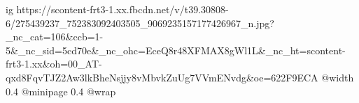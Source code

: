  
 
 
 
 

\ifcmt
  ig https://scontent-frt3-1.xx.fbcdn.net/v/t39.30808-6/275439237_752383092403505_9069235157177426967_n.jpg?_nc_cat=106&ccb=1-5&_nc_sid=5cd70e&_nc_ohc=EceQ8r48XFMAX8gWl1L&_nc_ht=scontent-frt3-1.xx&oh=00_AT-qxd8FqvTJZ2Aw3lkBheNsjjy8vMbvkZuUg7VVmENvdg&oe=622F9ECA
  @width 0.4
  @minipage 0.4
  @wrap \parpic[r]
\fi
